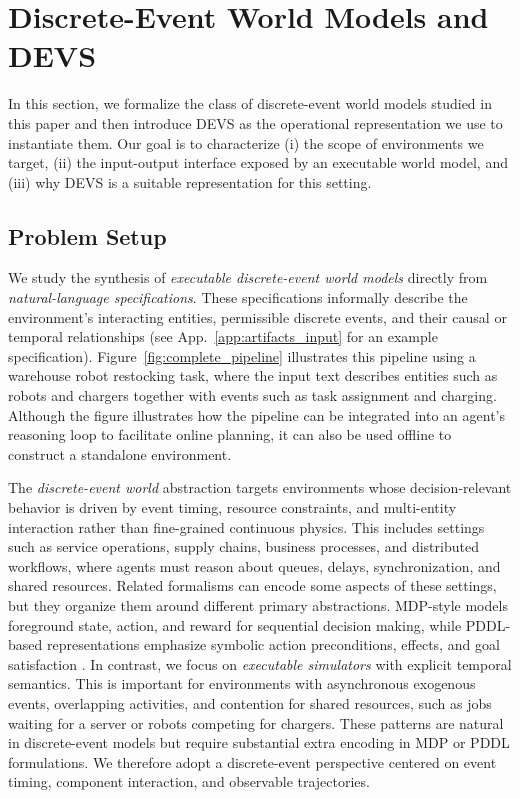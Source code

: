 
\section{Discrete-Event World Models and DEVS}\label{sec:preliminary}
In this section, we formalize the class of discrete-event world models studied in this paper and then introduce DEVS as the operational representation we use to instantiate them. Our goal is to characterize (i) the scope of environments we target, (ii) the input-output interface exposed by an executable world model, and (iii) why DEVS is a suitable representation for this setting.

\subsection{Problem Setup}
We study the synthesis of \emph{executable discrete-event world models} directly from \emph{natural-language specifications}. These specifications informally describe the environment's interacting entities, permissible discrete events, and their causal or temporal relationships (see App.~\ref{app:artifacts_input} for an example specification). Figure~\ref{fig:complete_pipeline} illustrates this pipeline using a warehouse robot restocking task, where the input text describes entities such as robots and chargers together with events such as task assignment and charging. Although the figure illustrates how the pipeline can be integrated into an agent's reasoning loop to facilitate online planning, it can also be used offline to construct a standalone environment.

The \emph{discrete-event world} abstraction targets environments whose decision-relevant behavior is driven by event timing, resource constraints, and multi-entity interaction rather than fine-grained continuous physics. This includes settings such as service operations, supply chains, business processes, and distributed workflows, where agents must reason about queues, delays, synchronization, and shared resources.
Related formalisms can encode some aspects of these settings, but they organize them around different primary abstractions. MDP-style models foreground state, action, and reward for sequential decision making, while PDDL-based representations emphasize symbolic action preconditions, effects, and goal satisfaction \cite{hu2025text2world,zhang2024open_domain_planning_repr,oswald2024llm_planning_domain_generators,mahdavi2024pddl_interaction}. In contrast, we focus on \emph{executable simulators} with explicit temporal semantics. This is important for environments with asynchronous exogenous events, overlapping activities, and contention for shared resources, such as jobs waiting for a server or robots competing for chargers. These patterns are natural in discrete-event models but require substantial extra encoding in MDP or PDDL formulations. We therefore adopt a discrete-event perspective centered on event timing, component interaction, and observable trajectories.

